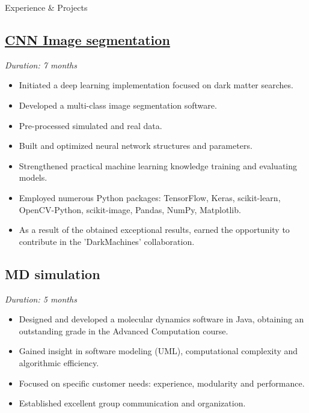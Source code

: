 \documentclass{resume} %
\begin{document}
\begin{rSection}{\large{Experience \& Projects {\href{https://github.com/aritzLizoain}{}}}}
\begin{adjustwidth}{-6mm}{0pt}
\vspace{-8pt}
 \subsection*{\href{https://github.com/aritzLizoain/CNN-Image-segmentation}{CNN Image segmentation}}
\vspace{-8pt}
\textit{Duration: 7 months}
\end{adjustwidth} 
\begin{adjustwidth}{-3.5mm}{0pt}
\begin{itemize}
\item Initiated a deep learning implementation focused on dark matter searches.
\item Developed a multi-class image segmentation software.
\item Pre-processed simulated and real data.
\item Built and optimized neural network structures and parameters. 
\item Strengthened practical machine learning knowledge training and evaluating models.
\item Employed numerous Python packages: TensorFlow, Keras, scikit-learn, OpenCV-Python, scikit-image, Pandas, NumPy, Matplotlib.
\item As a result of the obtained exceptional results, earned the opportunity to contribute in the 'DarkMachines' collaboration.

\end{itemize}
\end{adjustwidth}
\begin{adjustwidth}{-6mm}{0pt}
\vspace{-8pt}
\subsection*{MD simulation}
\vspace{-8pt}
\textit{Duration: 5 months}
\end{adjustwidth}
\begin{adjustwidth}{-3.5mm}{0pt}
\begin{itemize}
\item Designed and developed a molecular dynamics software in Java, obtaining an outstanding grade in the Advanced Computation course.
\item Gained insight in software modeling (UML), computational complexity and algorithmic efficiency.
\item Focused on specific customer needs: experience, modularity and performance.
\item Established excellent group communication and organization.


\end{itemize}
\end{adjustwidth}
\end{rSection}
\end{document}
